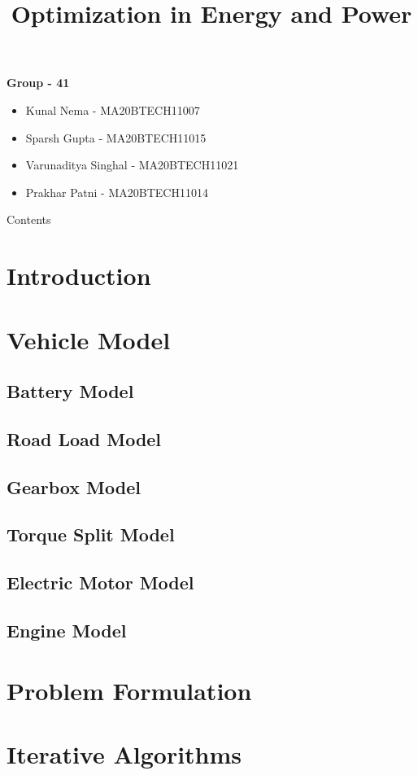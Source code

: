 \documentclass{beamer}
\title{Optimization in Energy and Power}
\institute{IIT Hyderabad}
\begin{document}
\begin{frame}
    \titlepage 
    

\textbf{Group - 41}
\begin{itemize}
    \item{Kunal Nema - MA20BTECH11007}
    \item{Sparsh Gupta - MA20BTECH11015}
    \item{Varunaditya Singhal - MA20BTECH11021}
    \item{Prakhar Patni - MA20BTECH11014}
\end{itemize}

\end{frame}

\begin{frame}{Contents}
    \tableofcontents
\end{frame}

\section{Introduction}
\section{Vehicle Model}
\subsection{Battery Model}
\subsection{Road Load Model}
\subsection{Gearbox Model}
\subsection{Torque Split Model}
\subsection{Electric Motor Model}
\subsection{Engine Model}
\section{Problem Formulation}
\section{Iterative Algorithms}
\end{document}
